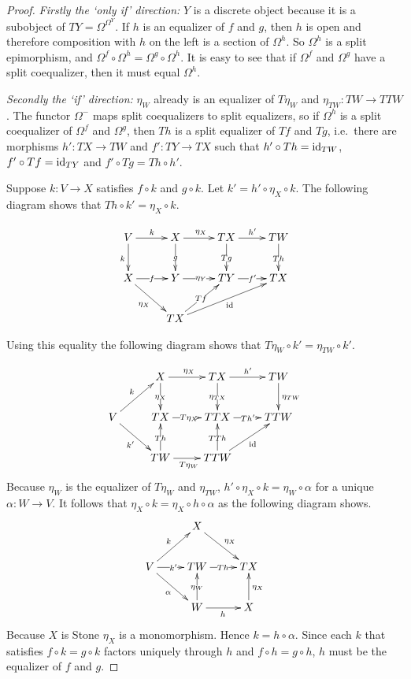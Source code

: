 \documentclass[sort&compress]{elsarticle}
\theoremstyle{plain}
\theoremstyle{definition}
\theoremstyle{remark}
\newcommand\hide[1]{}
\begin{document}
\begin{proof} \emph{Firstly the `only if' direction:} $Y$ is a discrete object because it is a subobject of $TY=\Omega^{\Omega^Y}$. If $h$ is an equalizer of $f$ and $g$, then $h$ is open and therefore composition with $h$ on the left is a section of $\Omega^h$. So $\Omega^h$ is a split epimorphism, and $\Omega^f\circ \Omega^h=\Omega^g\circ\Omega^h$. It is easy to see that if $\Omega^f$ and $\Omega^g$ have a split coequalizer, then it must equal $\Omega^h$.%

\emph{Secondly the `if' direction:} $\eta_W$ already is an equalizer of $T\eta_W$ and $\eta_{TW}: TW \to TTW$. The functor $\Omega^-$ maps split coequalizers to split equalizers, so if $\Omega^h$ is a split coequalizer of $\Omega^f$ and $\Omega^g$, then $Th$ is a split equalizer of $Tf$ and $Tg$, i.e.\ there are morphisms $h':TX \to TW$ and $f':TY\to TX$ such that $h'\circ Th = \mathrm{id}_{TW}$, $f'\circ Tf = \mathrm{id}_{TY}$ and $f'\circ Tg = Th\circ h'$.

Suppose $k: V\to X$ satisfies $f\circ k$ and $g\circ k$. Let $k'= h'\circ \eta_X\circ k$. The following diagram shows that $Th\circ k' = \eta_X\circ k$.
\hide{ Th h' \eta_X k = f' Tg \eta_X k = f' \eta_Y  g k = f' \eta_Y  f k = f' \eta_Y  f k = \eta_X\circ k}
\[ \xymatrix{
V\ar[r]^k\ar[d]_k & X\ar[r]^{\eta_X}\ar[d]|g & TX\ar[r]^{h'}\ar[d]|{Tg} & TW \ar[d]|{Th} \\
X \ar[r]|f \ar[dr]_{\eta_X} & Y \ar[r]|{\eta_Y} & TY \ar[r]|{f'} & TX \\
& TX\ar[ur]|{Tf} \ar[urr]_{\id}
}\]


Using this equality the following diagram shows that $T\eta_W \circ k' = \eta_{TW}\circ k'$.
\hide{
\underline{\id_{TTW}} T\eta_W  h' \eta_X  k = 
Th' \underline{TTh T\eta_W}  h' \eta_X  k =
Th' T\eta_X  \underline{Th  h'} \eta_X  k =
Th' T\eta_X  f' \underline{Tg  \eta_X}  k =
Th' T\eta_X  f' \eta_Y  \underline{g  k} =
Th' T\eta_X  \underline{ f' \eta_Y  f}  k =
Th' \underline{T\eta_X  \eta_X}  k =
\underline{Th' \eta_{TX}} \eta_X  k =
\eta_{TW} h' \eta_X  k
}
\[ \xymatrix{
& X \ar[r]^{\eta_X}\ar[d]|{\eta_X} & TX \ar[r]^{h'}\ar[d]|{\eta_{TX}} & TW \ar[d]^{\eta_{TW}}\\
V\ar[dr]_{k'}\ar[ur]^k & TX \ar[r]|{T\eta_X} & TTX \ar[r]|{Th'} & TTW \\
& TW\ar[r]_{T\eta_W}\ar[u]|{Th} & TTW \ar[ur]_\id \ar[u]|{TTh}
}\]
Because $\eta_W$ is the equalizer of $T\eta_W$ and $\eta_{TW}$, $h'\circ \eta_X \circ k = \eta_W\circ \alpha$ for a unique $\alpha: W\to V$. It follows that $\eta_X \circ k = \eta_X \circ h\circ \alpha$ as the following diagram shows.
\[ \xymatrix{
& X \ar[dr]^{\eta_X} \\
V \ar[r]|{k'}\ar[ur]^k\ar[dr]_\alpha &  TW\ar[r]|{Th} & TX \\
& W \ar[r]_h \ar[u]|{\eta_W} & X \ar[u]_{\eta_X}
}\]
Because $X$ is Stone $\eta_X$ is a monomorphism. Hence $k = h\circ \alpha$. Since each $k$ that satisfies $f\circ k = g\circ k$ factors uniquely through $h$ and $f\circ h = g\circ h$, $h$ must be the equalizer of $f$ and $g$.
\end{proof}
\end{document}
